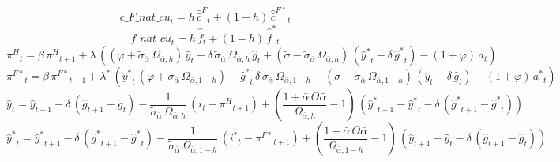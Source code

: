 \begin{dmath}
{c\_F\_nat\_cu}_{t}={{h}}\, {{\hat {\bar c}^F}}_{t}+\left(1-{{h}}\right)\, {{\hat {\bar c}^{F*}}}_{t}
\end{dmath}
\begin{dmath}
{f\_nat\_cu}_{t}={{h}}\, {{\hat {\bar f}}}_{t}+\left(1-{{h}}\right)\, {{\hat {\bar f}^*}}_{t}
\end{dmath}
\begin{dmath}
{{\pi^H}}_{t}={{\beta}}\, {{\pi^H}}_{t+1}+{{\lambda}}\, \left(\left({{\varphi}}+{{\tilde\sigma_{\bar{\alpha}}}}\, {{\Omega_{\bar \alpha,h}}}\right)\, {{\hat y}}_{t}-{{\delta}}\, {{\tilde\sigma_{\bar{\alpha}}}}\, {{\Omega_{\bar \alpha,h}}}\, {{\hat g}}_{t}+\left({{\tilde{\sigma}}}-{{\tilde\sigma_{\bar{\alpha}}}}\, {{\Omega_{\bar \alpha,h}}}\right)\, \left({{\hat y^*}}_{t}-{{\delta}}\, {{\hat g^*}}_{t}\right)-\left(1+{{\varphi}}\right)\, {{a}}_{t}\right)
\end{dmath}
\begin{dmath}
{{\pi^{F*}}}_{t}={{\beta}}\, {{\pi^{F*}}}_{t+1}+{{\lambda^*}}\, \left({{\hat y^*}}_{t}\, \left({{\varphi}}+{{\tilde\sigma_{\bar{\alpha}}}}\, {{\Omega_{\bar \alpha,1-h}}}\right)-{{\hat g^*}}_{t}\, {{\delta}}\, {{\tilde\sigma_{\bar{\alpha}}}}\, {{\Omega_{\bar \alpha,1-h}}}+\left({{\tilde{\sigma}}}-{{\tilde\sigma_{\bar{\alpha}}}}\, {{\Omega_{\bar \alpha,1-h}}}\right)\, \left({{\hat y}}_{t}-{{\delta}}\, {{\hat g}}_{t}\right)-\left(1+{{\varphi}}\right)\, {{a^*}}_{t}\right)
\end{dmath}
\begin{dmath}
{{\hat y}}_{t}={{\hat y}}_{t+1}-{{\delta}}\, \left({{\hat g}}_{t+1}-{{\hat g}}_{t}\right)-\frac{1}{{{\tilde\sigma_{\bar{\alpha}}}}\, {{\Omega_{\bar \alpha,h}}}}\, \left({{i}}_{t}-{{\pi^H}}_{t+1}\right)+\left(\frac{1+{{\bar{\alpha}}}\, {{\Theta{\bar{\alpha}}}}}{{{\Omega_{\bar \alpha,h}}}}-1\right)\, \left({{\hat y^*}}_{t+1}-{{\hat y^*}}_{t}-{{\delta}}\, \left({{\hat g^*}}_{t+1}-{{\hat g^*}}_{t}\right)\right)
\end{dmath}
\begin{dmath}
{{\hat y^*}}_{t}={{\hat y^*}}_{t+1}-{{\delta}}\, \left({{\hat g^*}}_{t+1}-{{\hat g^*}}_{t}\right)-\frac{1}{{{\tilde\sigma_{\bar{\alpha}}}}\, {{\Omega_{\bar \alpha,1-h}}}}\, \left({{i^*}}_{t}-{{\pi^{F*}}}_{t+1}\right)+\left(\frac{1+{{\bar{\alpha}}}\, {{\Theta{\bar{\alpha}}}}}{{{\Omega_{\bar \alpha,1-h}}}}-1\right)\, \left({{\hat y}}_{t+1}-{{\hat y}}_{t}-{{\delta}}\, \left({{\hat g}}_{t+1}-{{\hat g}}_{t}\right)\right)
\end{dmath}
